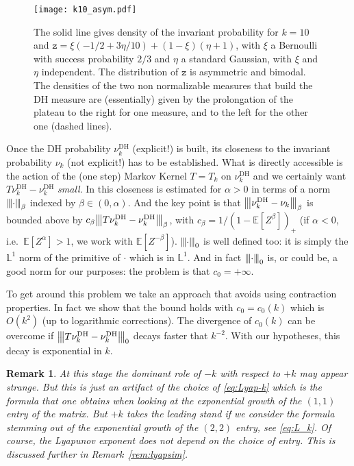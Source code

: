 \documentclass[reqno,11pt]{amsart}
\numberwithin{equation}{section}
\newtheorem{rem}[theorem]{Remark}
\newcommand{\bbE}{{\ensuremath{\mathbb E}} }
\newcommand{\bbL}{{\ensuremath{\mathbb L}} }
\newcommand{\ga}{\alpha}
\newcommand{\gb}{\beta}
\newcommand{\logZ}{\mathtt{z}}
\newcommand{\newnorm}[1]{{\left\vert\kern-0.25ex\left\vert\kern-0.25ex\left\vert #1 
    \right\vert\kern-0.25ex\right\vert\kern-0.25ex\right\vert}}
\begin{document}
 \begin{figure}[h]
\centering
\texttt{[image: k10\_asym.pdf]}
\caption{\label{fig:2} 
The solid line gives density of the invariant probability for 
$k=10$ and $\logZ= \xi (-1/2+3\eta/10)+(1-\xi)(\eta+1)$, with $\xi$ a Bernoulli with success probability $2/3$ and   $\eta$ a standard Gaussian, with $\xi$ and $\eta$ independent. The distribution of $\logZ$ is asymmetric and bimodal. %
The densities of the two non normalizable measures that build the DH measure are (essentially) given by the prolongation of the plateau to the right for one measure, and to the left for the other one (dashed lines). 
}
\end{figure}

Once the  DH probability  $\nu^{\textrm{DH}}_k$ (explicit!) is built, its closeness  to the invariant probability $\nu_k$ (not explicit!) has to be established. What is directly accessible is the action of the (one step) Markov Kernel $T=T_k$ on $\nu^{\textrm{DH}}_k$ and we certainly want $T \nu^{\textrm{DH}}_k-\nu^{\textrm{DH}}_k$ \emph{small}. In \cite{cf:GGG}  this closeness is estimated for $\ga>0$ in terms of a 
norm $\newnorm{\cdot}_\gb$ indexed by $\gb\in (0,  \ga )$. And the key point is that $\newnorm{\nu^{\textrm{DH}}_k-\nu_k}_\gb$ is bounded above by $c_\gb \newnorm{T \nu^{\textrm{DH}}_k-\nu^{\textrm{DH}}_k}_\gb$, with
 $c_\gb=1/(1-\bbE[Z^\gb])_+$ (if $\ga <0$, i.e.\ $\bbE[Z^\ga ]>1$,  we  work with $\bbE[Z^{-\gb}]$). 
 $\newnorm{\cdot}_0$ is well defined too: 
it is simply  the $\bbL^1$ norm of the primitive of $\cdot$ which is in $\bbL^1$. And in  fact $\newnorm{\cdot}_0$
 is, or could be, a good norm for our purposes: the problem is that   $c_0=+\infty$.
 
 
 
To get around this problem we take an approach that avoids using contraction properties. In fact we show that  the bound holds with $c_0=c_0(k)$ which is $O(k^2)$ (up to logarithmic corrections). The divergence of $c_0(k)$ can be overcome if $\newnorm{T \nu^{\textrm{DH}}_k-\nu^{\textrm{DH}}_k}_0$ decays faster that $k^{-2}$. With our hypotheses, this decay is exponential in $k$. 

\smallskip

\begin{rem}
\label{rem:sym}
At this stage the dominant role of $-k$  with respect to $+k$ may appear strange. But this is just an artifact of the choice of 
\eqref{eq:Lyap-k} which is the formula that one obtains when looking at the exponential growth of the $(1,1)$ entry of the matrix.  But $+k$ takes the leading stand if we consider the formula stemming out of  the exponential growth of the $(2,2)$ entry, see  \eqref{eq:L_k}. Of course, the Lyapunov exponent does not depend on the choice of entry. This is discussed further in  Remark~\ref{rem:lyapsim}.
\end{rem}
\end{document}
